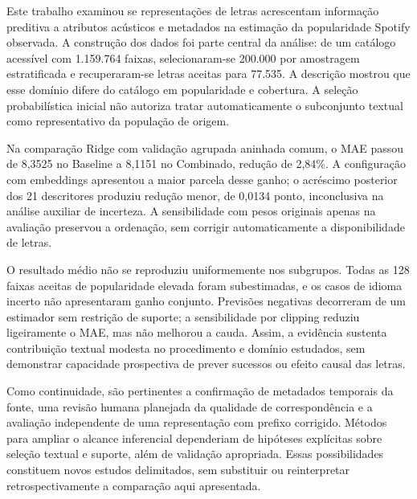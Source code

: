 Este trabalho examinou se representações de letras acrescentam informação preditiva a atributos acústicos e metadados na estimação da popularidade Spotify observada. A construção dos dados foi parte central da análise: de um catálogo acessível com 1.159.764 faixas, selecionaram-se 200.000 por amostragem estratificada e recuperaram-se letras aceitas para 77.535. A descrição mostrou que esse domínio difere do catálogo em popularidade e cobertura. A seleção probabilística inicial não autoriza tratar automaticamente o subconjunto textual como representativo da população de origem.

Na comparação Ridge com validação agrupada aninhada comum, o MAE passou de 8,3525 no Baseline a 8,1151 no Combinado, redução de 2,84\%. A configuração com embeddings apresentou a maior parcela desse ganho; o acréscimo posterior dos 21 descritores produziu redução menor, de 0,0134 ponto, inconclusiva na análise auxiliar de incerteza. A sensibilidade com pesos originais apenas na avaliação preservou a ordenação, sem corrigir automaticamente a disponibilidade de letras.

O resultado médio não se reproduziu uniformemente nos subgrupos. Todas as 128 faixas aceitas de popularidade elevada foram subestimadas, e os casos de idioma incerto não apresentaram ganho conjunto. Previsões negativas decorreram de um estimador sem restrição de suporte; a sensibilidade por clipping reduziu ligeiramente o MAE, mas não melhorou a cauda. Assim, a evidência sustenta contribuição textual modesta no procedimento e domínio estudados, sem demonstrar capacidade prospectiva de prever sucessos ou efeito causal das letras.

Como continuidade, são pertinentes a confirmação de metadados temporais da fonte, uma revisão humana planejada da qualidade de correspondência e a avaliação independente de uma representação com prefixo corrigido. Métodos para ampliar o alcance inferencial dependeriam de hipóteses explícitas sobre seleção textual e suporte, além de validação apropriada. Essas possibilidades constituem novos estudos delimitados, sem substituir ou reinterpretar retrospectivamente a comparação aqui apresentada.
